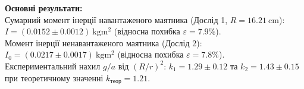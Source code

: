\documentclass[ukrainian]{ucaphyslab}
\begin{document}
\begin{keyfacts}
\textbf{Основні результати:} \\
Сумарний момент інерції навантаженого маятника (Дослід 1, $R = \SI{16.21}{\centi\meter}$): $I = (\num{0.0152} \pm \num{0.0012})\ \si{\kilogram\meter\squared}$ (відносна похибка $\varepsilon = 7.9\%$). \\
Момент інерції ненавантаженого маятника (Дослід 2): $I_0 = (\num{0.0217} \pm \num{0.0017})\ \si{\kilogram\meter\squared}$ (відносна похибка $\varepsilon = 7.8\%$). \\
Експериментальний нахил $g/a$ від $(R/r)^2$: $k_1 = \num{1.29} \pm \num{0.12}$ та $k_2 = \num{1.43} \pm \num{0.15}$ при теоретичному значенні $k_{\text{теор}} = \num{1.21}$.
\end{keyfacts}

\end{document}
